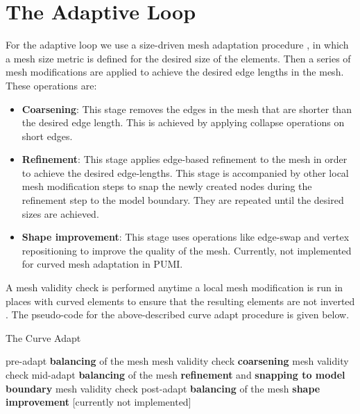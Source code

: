 \documentclass[review,12pt]{elsarticle_summary_report}
\begin{document}

\section{\label{adaptive_loop}The Adaptive Loop}

For the adaptive loop we use a size-driven mesh adaptation procedure \cite{LiShephard_03}, in which a mesh size metric is defined for the desired size of the elements. Then a series of mesh modifications are applied to achieve the desired edge lengths in the mesh. These operations are:
\begin{itemize}
  \item \textbf{Coarsening}: This stage removes the edges in the mesh that are shorter than the desired edge length. This is achieved by applying collapse operations on short edges.
  \item \textbf{Refinement}: This stage applies edge-based refinement to the mesh in order to achieve the desired edge-lengths. This stage is accompanied by other local mesh modification steps to snap the newly created nodes during the refinement step to the model boundary. They are repeated until the desired sizes are achieved.
  \item \textbf{Shape improvement}: This stage uses operations like edge-swap and vertex repositioning to improve the quality of the mesh. Currently, not implemented for curved mesh adaptation in PUMI.
\end{itemize}
A mesh validity check is performed anytime a local mesh modification is run in places with curved elements to ensure that the resulting elements are not inverted \cite[see][for more details]{LuoShephard_11}. The pseudo-code for the above-described curve adapt procedure is given below.

\begin{algorithm}
\caption{The Curve Adapt}\label{crv_adapt}
\begin{algorithmic}[1]
\State pre-adapt \textbf{balancing} of the mesh
\State mesh validity check
\State \textbf{coarsening}
\State mesh validity check
\State mid-adapt \textbf{balancing} of the mesh
\State \textbf{refinement} and \textbf{snapping to model boundary}
\State mesh validity check
\State post-adapt \textbf{balancing} of the mesh
\State \textbf{shape improvement} [currently not implemented]
\EndProcedure
\end{algorithmic}
\end{algorithm}
\end{document}
